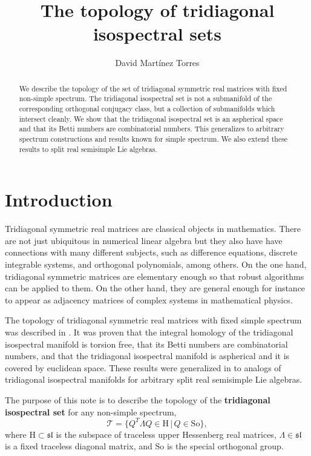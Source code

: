 \documentclass[reqno]{amsart}
\title[The topology of tridiagonal isospectral sets]{The topology of tridiagonal isospectral sets}
\author{David Mart\'inez Torres}
\renewcommand{\sl}{\mathfrak{sl}}
\newcommand{\cT}{\mathcal{T}}
\newcommand{\So}{\mathrm{So}}
\renewcommand{\H}{\mathrm{H}}
\begin{document}
\begin{abstract} We describe the topology of the set of tridiagonal symmetric real matrices with fixed non-simple spectrum. The tridiagonal isospectral set is not a submanifold of the corresponding orthogonal conjugacy class, but a collection of submanifolds  which intersect cleanly. We show that the tridiagonal isospectral set is an aspherical space   and that its Betti numbers are combinatorial numbers. This  generalizes to arbitrary spectrum constructions and results known for simple spectrum. We also extend these results to split real semisimple Lie algebras.
 \end{abstract}
\maketitle

\section{Introduction}

Tridiagonal symmetric real matrices are classical objects in mathematics. There are not just ubiquitous in
numerical linear algebra but  they also have have  connections with many different subjects, such as difference equations, discrete integrable systems, and orthogonal polynomials, among others. On the one hand, tridiagonal symmetric matrices are elementary enough so that robust algorithms can be applied to them. On the other hand, they are general enough for instance to appear as adjacency matrices of complex systems in mathematical physics.

The topology of tridiagonal  symmetric real matrices with fixed simple spectrum was described in \cite{To}. It was proven that the integral homology  of the tridiagonal isospectral manifold is torsion free, that its Betti numbers are combinatorial numbers, and that the tridiagonal isospectral manifold is  aspherical and it is covered by euclidean space. These results were generalized in \cite{Da2} to analogs of tridiagonal isospectral manifolds for arbitrary split real semisimple Lie algebras.

The purpose of this note is to describe the topology of the {\bf tridiagonal isospectral set}
for any non-simple spectrum,
\[\cT=\{Q^T\Lambda Q\in \H\,|\,Q\in \So\},\]
where $\H\subset \sl$ is the subspace of traceless  upper Hessenberg real matrices, $\Lambda\in \sl$ is a fixed traceless  diagonal matrix, and $\So$ is the special orthogonal group.
\end{document}
